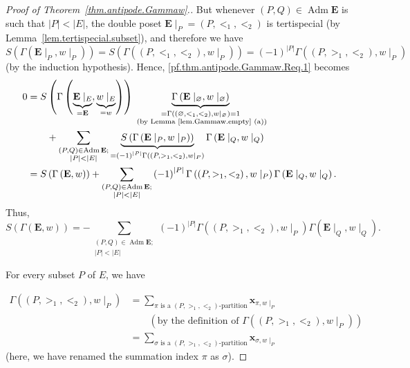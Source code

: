 \documentclass[12pt]{article}
\theoremstyle{plain}
\theoremstyle{definition}
\theoremstyle{remark}
\let\sumnonlimits\sum
\renewcommand{\sum}{\sumnonlimits\limits}
\newcommand{\xx}{{\mathbf{x}}}
\newcommand{\Adm}{\operatorname{Adm}}
\newcommand{\EE}{{\mathbf{E}}}
\begin{document}
\begin{proof}[Proof of Theorem~\ref{thm.antipode.Gammaw}.]
But whenever $\left(P, Q\right) \in \Adm \EE$ is such that
$\left|P\right| < \left|E\right|$, the double poset
$\EE\mid_P = \left(P, <_1, <_2\right)$ is tertispecial
(by Lemma~\ref{lem.tertispecial.subset}), and
therefore we have
$S\left(\Gamma\left(\EE\mid_P, w\mid_P\right)\right)
= S\left(\Gamma\left(\left(P, <_1, <_2\right), w\mid_P\right)\right)
= \left(-1\right)^{\left|P\right|}
\Gamma\left(\left(P, >_1, <_2\right), w\mid_P\right)$
(by the induction hypothesis).
Hence,
\eqref{pf.thm.antipode.Gammaw.Req.1} becomes
\begin{align}
0
&= S \left(\Gamma\left(\underbrace{\EE\mid_E}_{=\EE},
           \underbrace{w\mid_E}_{=w}\right)\right)
  \underbrace{\Gamma\left(\EE\mid_\varnothing, w\mid_\varnothing\right)
             }_{\substack{
             =\Gamma\left(\left(\varnothing, <_1, <_2\right), w\mid_\varnothing\right)
             =1 \\ \text{ (by Lemma \ref{lem.Gammaw.empty} (a))}}}
     \nonumber \\
& \qquad + \sum_{\substack{\left(P, Q\right) \in \Adm \EE ; \\
                  \left|P\right| < \left|E\right|}}
  \underbrace{S\left(\Gamma\left(\EE\mid_P, w\mid_P\right)\right)
             }_{= \left(-1\right)^{\left|P\right|}
                  \Gamma\left(\left(P, >_1, <_2\right), w\mid_P\right)}
  \Gamma\left(\EE\mid_Q, w\mid_Q\right)
     \nonumber \\
& = S\left(\Gamma\left(\EE, w\right)\right)
  + \sum_{\substack{\left(P, Q\right) \in \Adm \EE ; \\
                  \left|P\right| < \left|E\right|}}
  \left(-1\right)^{\left|P\right|}
  \Gamma\left(\left(P, >_1, <_2\right), w\mid_P\right)
  \Gamma\left(\EE\mid_Q, w\mid_Q\right) .
\nonumber
\end{align}
Thus,
\begin{equation}
S\left(\Gamma\left(\EE, w\right)\right)
= - \sum_{\substack{\left(P, Q\right) \in \Adm \EE ; \\
                  \left|P\right| < \left|E\right|}}
\left(-1\right)^{\left|P\right|}
\Gamma\left(\left(P, >_1, <_2\right), w\mid_P\right)
\Gamma\left(\EE\mid_Q, w\mid_Q\right) .
\label{pf.thm.antipode.Gammaw.Seq}
\end{equation}


For every subset $P$ of $E$, we have

\begin{align}
\Gamma\left(\left(P, >_1, <_2\right), w\mid_P\right)
&= \sum_{\pi \text{ is a }\left(P, >_1, <_2\right)\text{-partition}}
\xx_{\pi, w\mid_P}
\nonumber \\
& \qquad \left(\text{by the definition of }
 \Gamma\left(\left(P, >_1, <_2\right), w\mid_P\right) \right)
\nonumber \\
& = \sum_{\sigma \text{ is a }\left(P, >_1, <_2\right)\text{-partition}}
\xx_{\sigma, w\mid_P}
\label{pf.thm.antipode.Gammaw.Req.pf.Gamma1}
\end{align}
(here, we have renamed the summation index $\pi$ as
$\sigma$).


\end{proof}
\end{document}

